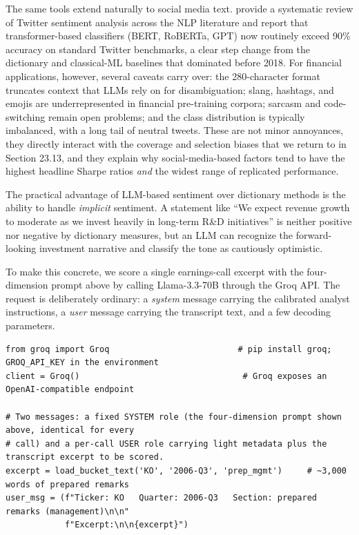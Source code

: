 The same tools extend naturally to social media text. \cite{albladi2025twitter} provide a systematic review of Twitter sentiment analysis across the NLP literature and report that transformer-based classifiers (BERT, RoBERTa, GPT) now routinely exceed 90\% accuracy on standard Twitter benchmarks, a clear step change from the dictionary and classical-ML baselines that dominated before 2018. For financial applications, however, several caveats carry over: the 280-character format truncates context that LLMs rely on for disambiguation; slang, hashtags, and emojis are underrepresented in financial pre-training corpora; sarcasm and code-switching remain open problems; and the class distribution is typically imbalanced, with a long tail of neutral tweets. These are not minor annoyances, they directly interact with the coverage and selection biases that we return to in Section 23.13, and they explain why social-media-based factors tend to have the highest headline Sharpe ratios \textit{and} the widest range of replicated performance.

The practical advantage of LLM-based sentiment over dictionary methods is the ability to handle \textit{implicit} sentiment. A statement like ``We expect revenue growth to moderate as we invest heavily in long-term R\&D initiatives'' is neither positive nor negative by dictionary measures, but an LLM can recognize the forward-looking investment narrative and classify the tone as cautiously optimistic.

To make this concrete, we score a single earnings-call excerpt with the four-dimension prompt above by calling Llama-3.3-70B through the Groq API. The request is deliberately ordinary: a \textit{system} message carrying the calibrated analyst instructions, a \textit{user} message carrying the transcript text, and a few decoding parameters.

\begin{verbatim}
from groq import Groq                          # pip install groq; GROQ_API_KEY in the environment
client = Groq()                                 # Groq exposes an OpenAI-compatible endpoint

# Two messages: a fixed SYSTEM role (the four-dimension prompt shown above, identical for every
# call) and a per-call USER role carrying light metadata plus the transcript excerpt to be scored.
excerpt = load_bucket_text('KO', '2006-Q3', 'prep_mgmt')     # ~3,000 words of prepared remarks
user_msg = (f"Ticker: KO   Quarter: 2006-Q3   Section: prepared remarks (management)\n\n"
            f"Excerpt:\n\n{excerpt}")
\end{verbatim}


